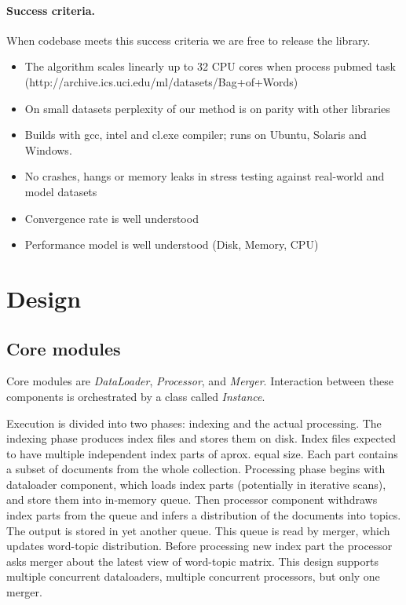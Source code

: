 \documentclass[11pt,a4paper,twoside]{report}
\begin{document}
\paragraph{Success criteria.}
When codebase meets this success criteria we are free to release the library.
\begin{itemize}
    \item The algorithm scales linearly up to 32 CPU cores when process pubmed task (http://archive.ics.uci.edu/ml/datasets/Bag+of+Words)
    \item On small datasets perplexity of our method is on parity with other libraries
    \item Builds with gcc, intel and cl.exe compiler; runs on Ubuntu, Solaris and Windows.
    \item No crashes, hangs or memory leaks in stress testing against real-world and model datasets
    \item Convergence rate is well understood
    \item Performance model is well understood (Disk, Memory, CPU)
\end{itemize}

\section{Design}

\subsection{Core modules}

Core modules are \emph{DataLoader}, \emph{Processor}, and \emph{Merger}.
Interaction between these components is orchestrated by a class called \emph{Instance}.

Execution is divided into two phases: indexing and the actual processing.
The indexing phase produces index files and stores them on disk.
Index files expected to have multiple independent index parts of aprox. equal size.
Each part contains a subset of documents from the whole collection.
Processing phase begins with dataloader component, which loads index parts
(potentially in iterative scans), and store them into in-memory queue.
Then processor component withdraws index parts from the queue
and infers a distribution of the documents into topics.
The output is stored in yet another queue.
This queue is read by merger, which updates word-topic distribution.
Before processing new index part the processor asks merger about the latest view of word-topic matrix.
This design supports multiple concurrent dataloaders, multiple concurrent processors, but only one merger.
\end{document}

